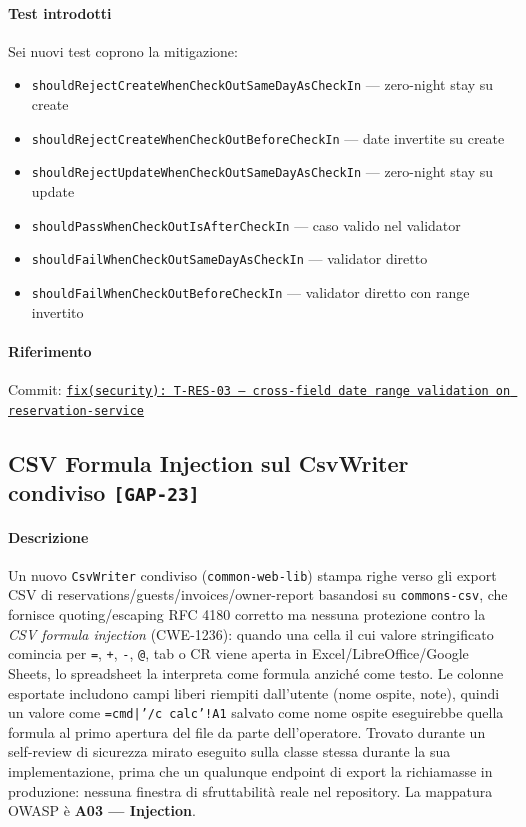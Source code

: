 ﻿\documentclass[a4paper,12pt]{report}
\newcommand{\commitref}[2]{\texttt{\small \href{https://github.com/diegoandruccioli/hotel-pms/commit/#1}{#2}}}
\newcommand{\threat}[1]{\texttt{\small\textcolor{vulnred}{[#1]}}}
\begin{document}
\paragraph{Test introdotti}
Sei nuovi test coprono la mitigazione:
\begin{itemize}
  \item \texttt{shouldRejectCreateWhenCheckOutSameDayAsCheckIn} --- zero-night stay su create
  \item \texttt{shouldRejectCreateWhenCheckOutBeforeCheckIn} --- date invertite su create
  \item \texttt{shouldRejectUpdateWhenCheckOutSameDayAsCheckIn} --- zero-night stay su update
  \item \texttt{shouldPassWhenCheckOutIsAfterCheckIn} --- caso valido nel validator
  \item \texttt{shouldFailWhenCheckOutSameDayAsCheckIn} --- validator diretto
  \item \texttt{shouldFailWhenCheckOutBeforeCheckIn} --- validator diretto con range invertito
\end{itemize}

\paragraph{Riferimento} Commit: \commitref{43be320}{fix(security): T-RES-03 --- cross-field date range validation on reservation-service}

\subsection{CSV Formula Injection sul CsvWriter condiviso \threat{GAP-23}}

\paragraph{Descrizione}
Un nuovo \texttt{CsvWriter} condiviso (\texttt{common-web-lib}) stampa righe verso gli
export CSV di reservations/guests/invoices/owner-report basandosi su
\texttt{commons-csv}, che fornisce quoting/escaping RFC 4180 corretto ma nessuna
protezione contro la \emph{CSV formula injection} (CWE-1236): quando una cella il cui
valore stringificato comincia per \texttt{=}, \texttt{+}, \texttt{-}, \texttt{@}, tab o
CR viene aperta in Excel/LibreOffice/Google Sheets, lo spreadsheet la interpreta come
formula anziché come testo. Le colonne esportate includono campi liberi
riempiti dall'utente (nome ospite, note), quindi un valore come
\texttt{=cmd|'/c calc'!A1} salvato come nome ospite eseguirebbe quella formula al primo
apertura del file da parte dell'operatore. Trovato durante un self-review di sicurezza
mirato eseguito sulla classe stessa durante la sua implementazione, prima che un
qualunque endpoint di export la richiamasse in produzione: nessuna finestra di
sfruttabilità reale nel repository. La mappatura OWASP è \textbf{A03 --- Injection}.
\end{document}
